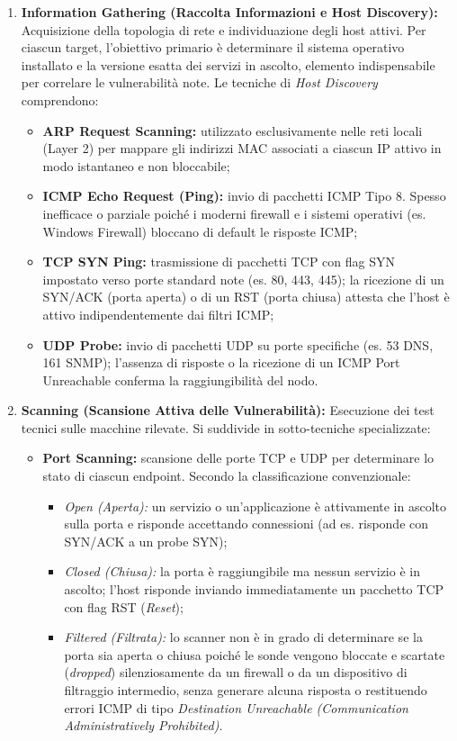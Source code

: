 \documentclass[../../main.tex]{subfiles}
\begin{document}
\begin{enumerate}
    \item \textbf{Information Gathering (Raccolta Informazioni e Host Discovery):} Acquisizione della topologia di rete e individuazione degli host attivi. Per ciascun target, l'obiettivo primario è determinare il sistema operativo installato e la versione esatta dei servizi in ascolto, elemento indispensabile per correlare le vulnerabilità note. Le tecniche di \textit{Host Discovery} comprendono:
    \begin{itemize}
        \item \textbf{ARP Request Scanning:} utilizzato esclusivamente nelle reti locali (Layer 2) per mappare gli indirizzi MAC associati a ciascun IP attivo in modo istantaneo e non bloccabile;
        \item \textbf{ICMP Echo Request (Ping):} invio di pacchetti ICMP Tipo 8. Spesso inefficace o parziale poiché i moderni firewall e i sistemi operativi (es. Windows Firewall) bloccano di default le risposte ICMP;
        \item \textbf{TCP SYN Ping:} trasmissione di pacchetti TCP con flag SYN impostato verso porte standard note (es. 80, 443, 445); la ricezione di un SYN/ACK (porta aperta) o di un RST (porta chiusa) attesta che l'host è attivo indipendentemente dai filtri ICMP;
        \item \textbf{UDP Probe:} invio di pacchetti UDP su porte specifiche (es. 53 DNS, 161 SNMP); l'assenza di risposte o la ricezione di un ICMP Port Unreachable conferma la raggiungibilità del nodo.
    \end{itemize}
    
    \item \textbf{Scanning (Scansione Attiva delle Vulnerabilità):} Esecuzione dei test tecnici sulle macchine rilevate. Si suddivide in sotto-tecniche specializzate:
    \begin{itemize}
        \item \textbf{Port Scanning:} scansione delle porte TCP e UDP per determinare lo stato di ciascun endpoint. Secondo la classificazione convenzionale:
        \begin{itemize}
            \item \textit{Open (Aperta):} un servizio o un'applicazione è attivamente in ascolto sulla porta e risponde accettando connessioni (ad es. risponde con SYN/ACK a un probe SYN);
            \item \textit{Closed (Chiusa):} la porta è raggiungibile ma nessun servizio è in ascolto; l'host risponde inviando immediatamente un pacchetto TCP con flag RST (\textit{Reset});
            \item \textit{Filtered (Filtrata):} lo scanner non è in grado di determinare se la porta sia aperta o chiusa poiché le sonde vengono bloccate e scartate (\textit{dropped}) silenziosamente da un firewall o da un dispositivo di filtraggio intermedio, senza generare alcuna risposta o restituendo errori ICMP di tipo \textit{Destination Unreachable (Communication Administratively Prohibited)}.
        \end{itemize}
        

\end{itemize}
\end{enumerate}
\end{document}
